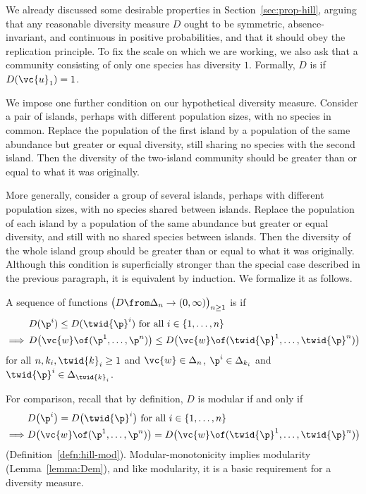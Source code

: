 We already discussed some desirable properties in
Section~\ref{sec:prop-hill}, arguing that any reasonable diversity measure
$D$ ought to be symmetric, absence-invariant, and continuous in positive
probabilities, and that it should obey the replication principle.  To fix
the scale on which we are working, we also ask that a community consisting
of only one species has diversity $1$.  Formally, $D$ is
 if $D(\vc{u}_1) = 1$.

We impose one further condition on our hypothetical diversity measure.
Consider a pair of islands, perhaps with different population sizes, with
no species in common.  Replace the population of the first island by a
population of the same abundance but greater or equal diversity,
still sharing no species with the second island.  Then the diversity of the
two-island community should be greater than or equal to what it was
originally.

More generally, consider a group of several islands, perhaps with different
population sizes, with no species shared between islands.  Replace the
population of each island by a population of the same abundance but greater
or equal diversity, and still with no shared species between islands.  Then
the diversity of the whole island group should be greater than or equal to
what it was originally.  Although this condition is superficially stronger
than the special case described in the previous paragraph, it is equivalent
by induction.  We formalize it as follows.

\begin{defn}
A sequence of functions $\bigl( D \from \Delta_n \to (0, \infty) \bigr)_{n
  \geq 1}$ is %
%
%  
if 
% 
\begin{align*}
&
D(\p^i) \leq D(\twid{\p}^i) \text{ for all } i \in \{1, \ldots, n\}     \\
\implies\,
&
D\bigl( \vc{w} \of (\p^1, \ldots, \p^n) \bigr) \leq
D\bigl( \vc{w} \of (\twid{\p}^1, \ldots, \twid{\p}^n) \bigr) 
\end{align*}
% 
for all $n, k_i, \twid{k}_i \geq 1$ and $\vc{w} \in \Delta_n$, $\p^i \in
\Delta_{k_i}$ and $\twid{\p}^i \in \Delta_{\twid{k}_i}$.  
\end{defn}

For comparison, recall that by definition,
$D$ is modular if and only if
% 
\begin{align*}
&
D\bigl(\p^i\bigr) = D\bigl(\twid{\p}^i\bigr) 
\text{ for all } i \in \{1, \ldots, n\}     \\
\implies
&
D\bigl( \vc{w} \of (\p^1, \ldots, \p^n) \bigr) =
D\bigl( \vc{w} \of (\twid{\p}^1, \ldots, \twid{\p}^n) \bigr)
\end{align*}
% 
(Definition~\ref{defn:hill-mod}).  Modular-monotonicity implies modularity
(Lemma~\ref{lemma:Dem}), and like modularity, it is a basic requirement for
a diversity measure.

